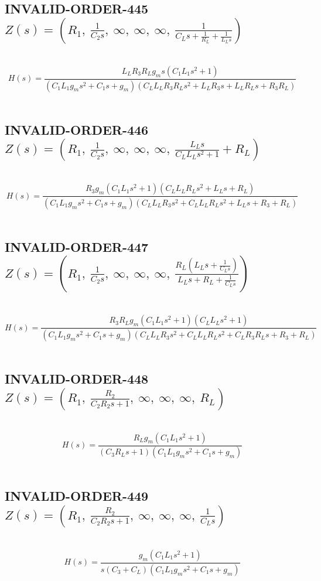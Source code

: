 \documentclass{article}
\begin{document}
\subsection{INVALID-ORDER-445 $Z(s) = \left( R_{1}, \  \frac{1}{C_{2} s}, \  \infty, \  \infty, \  \infty, \  \frac{1}{C_{L} s + \frac{1}{R_{L}} + \frac{1}{L_{L} s}}\right)$ } \ 
\textbf{\[H(s) = \frac{L_{L} R_{3} R_{L} g_{m} s \left(C_{1} L_{1} s^{2} + 1\right)}{\left(C_{1} L_{1} g_{m} s^{2} + C_{1} s + g_{m}\right) \left(C_{L} L_{L} R_{3} R_{L} s^{2} + L_{L} R_{3} s + L_{L} R_{L} s + R_{3} R_{L}\right)}\] } \ 
\subsection{INVALID-ORDER-446 $Z(s) = \left( R_{1}, \  \frac{1}{C_{2} s}, \  \infty, \  \infty, \  \infty, \  \frac{L_{L} s}{C_{L} L_{L} s^{2} + 1} + R_{L}\right)$ } \ 
\textbf{\[H(s) = \frac{R_{3} g_{m} \left(C_{1} L_{1} s^{2} + 1\right) \left(C_{L} L_{L} R_{L} s^{2} + L_{L} s + R_{L}\right)}{\left(C_{1} L_{1} g_{m} s^{2} + C_{1} s + g_{m}\right) \left(C_{L} L_{L} R_{3} s^{2} + C_{L} L_{L} R_{L} s^{2} + L_{L} s + R_{3} + R_{L}\right)}\] } \ 
\subsection{INVALID-ORDER-447 $Z(s) = \left( R_{1}, \  \frac{1}{C_{2} s}, \  \infty, \  \infty, \  \infty, \  \frac{R_{L} \left(L_{L} s + \frac{1}{C_{L} s}\right)}{L_{L} s + R_{L} + \frac{1}{C_{L} s}}\right)$ } \ 
\textbf{\[H(s) = \frac{R_{3} R_{L} g_{m} \left(C_{1} L_{1} s^{2} + 1\right) \left(C_{L} L_{L} s^{2} + 1\right)}{\left(C_{1} L_{1} g_{m} s^{2} + C_{1} s + g_{m}\right) \left(C_{L} L_{L} R_{3} s^{2} + C_{L} L_{L} R_{L} s^{2} + C_{L} R_{3} R_{L} s + R_{3} + R_{L}\right)}\] } \ 
\subsection{INVALID-ORDER-448 $Z(s) = \left( R_{1}, \  \frac{R_{2}}{C_{2} R_{2} s + 1}, \  \infty, \  \infty, \  \infty, \  R_{L}\right)$ } \ 
\textbf{\[H(s) = \frac{R_{L} g_{m} \left(C_{1} L_{1} s^{2} + 1\right)}{\left(C_{3} R_{L} s + 1\right) \left(C_{1} L_{1} g_{m} s^{2} + C_{1} s + g_{m}\right)}\] } \ 
\subsection{INVALID-ORDER-449 $Z(s) = \left( R_{1}, \  \frac{R_{2}}{C_{2} R_{2} s + 1}, \  \infty, \  \infty, \  \infty, \  \frac{1}{C_{L} s}\right)$ } \ 
\textbf{\[H(s) = \frac{g_{m} \left(C_{1} L_{1} s^{2} + 1\right)}{s \left(C_{3} + C_{L}\right) \left(C_{1} L_{1} g_{m} s^{2} + C_{1} s + g_{m}\right)}\] } \ 
\end{document}
